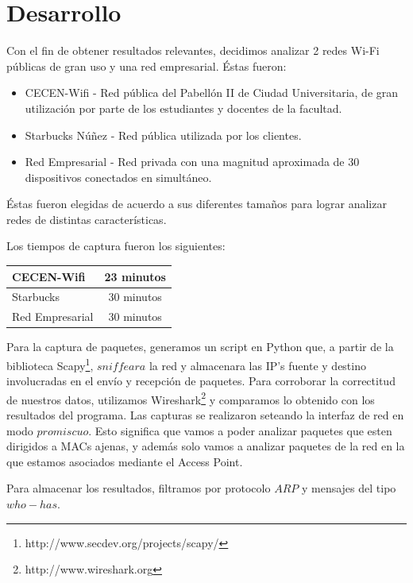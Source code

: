 \documentclass[10pt, a4paper]{article}
\begin{document}
\section{Desarrollo}

Con el fin de obtener resultados relevantes, decidimos analizar 2 redes Wi-Fi públicas de gran uso y una red empresarial. Éstas fueron:

\begin{itemize}
\item CECEN-Wifi - Red pública del Pabellón II de Ciudad Universitaria, de gran utilización por parte de los estudiantes y docentes de la facultad.
\item Starbucks Núñez - Red pública utilizada por los clientes.
\item Red Empresarial - Red privada con una magnitud aproximada de 30 dispositivos conectados en simultáneo.
\end{itemize}

Éstas fueron elegidas de acuerdo a sus diferentes tamaños para lograr analizar redes de distintas características.
 
Los tiempos de captura fueron los siguientes:

\begin{center}
  \begin{tabular}{| l | c |}
    \hline
    CECEN-Wifi & 23 minutos\\ \hline
    Starbucks & 30 minutos\\ \hline
    Red Empresarial & 30 minutos\\
    \hline
  \end{tabular}
\end{center}

Para la captura de paquetes, generamos un script en Python que, a partir de la biblioteca Scapy\footnote{http://www.secdev.org/projects/scapy/}, $sniffeara$ la red y almacenara las IP's fuente y destino involucradas en el envío y recepción de paquetes. Para corroborar la correctitud de nuestros datos, utilizamos Wireshark\footnote{http://www.wireshark.org} y comparamos lo obtenido con los resultados del programa. 
Las capturas se realizaron seteando la interfaz de red en modo $promiscuo$. Esto significa que vamos a poder analizar paquetes que esten dirigidos a MACs ajenas, y además solo vamos a analizar paquetes de la red en la que estamos asociados mediante el Access Point.

Para almacenar los resultados, filtramos por protocolo $ARP$ y mensajes del tipo $who-has$.
\end{document}
